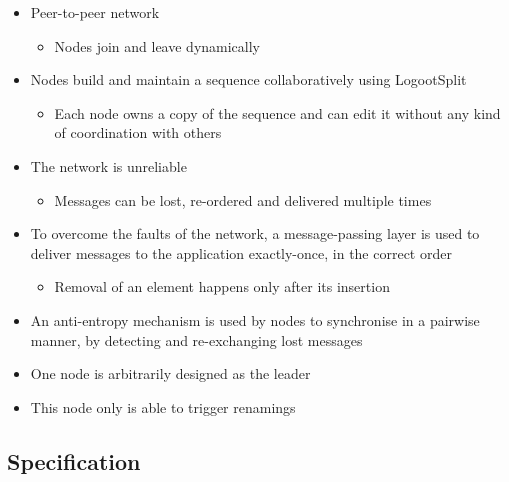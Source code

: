 \documentclass{article}
\begin{document}
\begin{itemize}
    \item Peer-to-peer network
    \begin{itemize}
        \item Nodes join and leave dynamically
    \end{itemize}
    \item Nodes build and maintain a sequence collaboratively using LogootSplit
    \begin{itemize}
        \item Each node owns a copy of the sequence and can edit it without any kind of coordination with others
    \end{itemize}
    \item The network is unreliable
    \begin{itemize}
        \item Messages can be lost, re-ordered and delivered multiple times
    \end{itemize}
    \item To overcome the faults of the network, a message-passing layer is used to deliver messages to the application exactly-once, in the correct order
    \begin{itemize}
        \item Removal of an element happens only after its insertion
    \end{itemize}
    \item An anti-entropy mechanism is used by nodes to synchronise in a pairwise manner, by detecting and re-exchanging lost messages

    \item One node is arbitrarily designed as the leader
    \item This node only is able to trigger renamings
\end{itemize}

\subsection{Specification}
\end{document}
